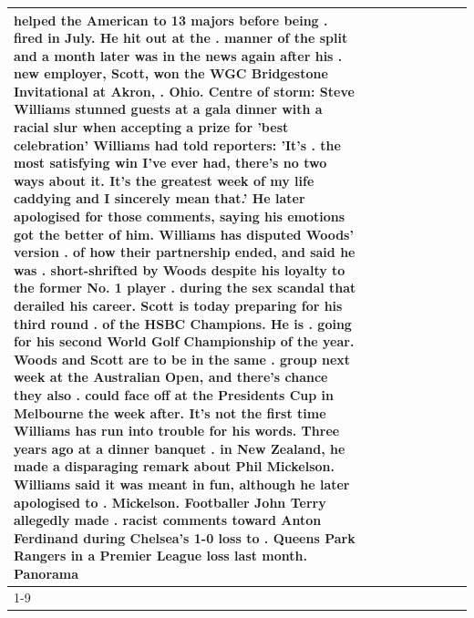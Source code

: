 \begin{table}[H]
\begin{tabular}{lllrlllll}
helped the American to 13 majors before being . fired in July. He hit out at the . manner of the split and a month later was in the news again after his . new employer, Scott, won the WGC Bridgestone Invitational at Akron, . Ohio. Centre of storm: Steve Williams stunned guests at a gala dinner with a racial slur when accepting a prize for 'best celebration' Williams had told reporters: 'It's . the most satisfying win I've ever had, there's no two ways about it. It's the greatest week of my life caddying and I sincerely mean that.' He later apologised for those comments, saying his emotions got the better of him. Williams has disputed Woods' version . of how their partnership ended, and said he was . short-shrifted by Woods despite his loyalty to the former No. 1 player . during the sex scandal that derailed his career. Scott is today preparing for his third round . of the HSBC Champions. He is . going for his second World Golf Championship of the year. Woods and Scott are to be in the same . group next week at the Australian Open, and there's chance they also . could face off at the Presidents Cup in Melbourne the week after. It's not the first time Williams has run into trouble for his words. Three years ago at a dinner banquet . in New Zealand, he made a disparaging remark about Phil Mickelson. Williams said it was meant in fun, although he later apologised to . Mickelson. Footballer John Terry allegedly made . racist comments toward Anton Ferdinand during Chelsea's 1-0 loss to . Queens Park Rangers in a Premier League loss last month. Panorama \\
\cline{1-9}

\end{tabular}
\end{table}
